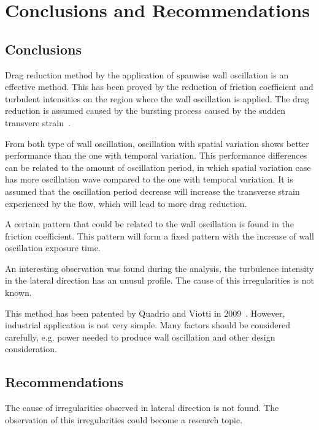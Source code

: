 \chapter{Conclusions and Recommendations}
\section{Conclusions}
Drag reduction method by the application of spanwise wall oscillation is an effective method. This has been proved by the reduction of friction coefficient and turbulent intensities on the region where the wall oscillation is applied. The drag reduction is assumed caused by the bursting process caused by the sudden transvere strain~\cite{Jung}. 

From both type of wall oscillation, oscillation with spatial variation shows better performance than the one with temporal variation. This performance differences can be related to the amount of oscillation period, in which spatial variation case has more oscillation wave compared to the one with temporal variation. It is assumed that the oscillation period decrease will increase the transverse strain experienced by the flow, which will lead to more drag reduction. 

A certain pattern that could be related to the wall oscillation is found in the friction coefficient. This pattern will form a fixed pattern with the increase of wall oscillation exposure time.

An interesting observation was found during the analysis, the turbulence intensity in the lateral direction has an unusul profile. The cause of this irregularities is not known. 

This method has been patented by Quadrio and Viotti in 2009~\cite{viotti}. However, industrial application is not very simple. Many factors should be considered carefully, e.g. power needed to produce wall oscillation and other design consideration.

\section{Recommendations}
The cause of irregularities observed in lateral direction is not found. The observation of this irregularities could become a research topic. 

